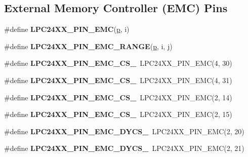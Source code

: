\subsection*{External Memory Controller (E\+MC) Pins}
\begin{DoxyCompactItemize}
\item 
\#define {\bfseries L\+P\+C24\+X\+X\+\_\+\+P\+I\+N\+\_\+\+E\+MC}(\mbox{\hyperlink{sun4u_2tte_8h_a27952ffc298d15b4fc0e7ee6b2a044ac}{p}},  i)
\item 
\#define {\bfseries L\+P\+C24\+X\+X\+\_\+\+P\+I\+N\+\_\+\+E\+M\+C\+\_\+\+R\+A\+N\+GE}(\mbox{\hyperlink{sun4u_2tte_8h_a27952ffc298d15b4fc0e7ee6b2a044ac}{p}},  i,  j)
\item 
\mbox{\label{group__lpc24xx__io_ga6345960feb225c5a71ecacb9d500dc6c}} 
\#define {\bfseries L\+P\+C24\+X\+X\+\_\+\+P\+I\+N\+\_\+\+E\+M\+C\+\_\+\+C\+S\+\_}~L\+P\+C24\+X\+X\+\_\+\+P\+I\+N\+\_\+\+E\+MC(4, 30)
\item 
\mbox{\label{group__lpc24xx__io_gaa30c60311e6005d08e1ccf1c231ca0f4}} 
\#define {\bfseries L\+P\+C24\+X\+X\+\_\+\+P\+I\+N\+\_\+\+E\+M\+C\+\_\+\+C\+S\+\_}~L\+P\+C24\+X\+X\+\_\+\+P\+I\+N\+\_\+\+E\+MC(4, 31)
\item 
\mbox{\label{group__lpc24xx__io_ga4c858855d3659c3833482fa2e6d5cbda}} 
\#define {\bfseries L\+P\+C24\+X\+X\+\_\+\+P\+I\+N\+\_\+\+E\+M\+C\+\_\+\+C\+S\+\_}~L\+P\+C24\+X\+X\+\_\+\+P\+I\+N\+\_\+\+E\+MC(2, 14)
\item 
\mbox{\label{group__lpc24xx__io_gabcfc27fd17054dae061ce4552db55a53}} 
\#define {\bfseries L\+P\+C24\+X\+X\+\_\+\+P\+I\+N\+\_\+\+E\+M\+C\+\_\+\+C\+S\+\_}~L\+P\+C24\+X\+X\+\_\+\+P\+I\+N\+\_\+\+E\+MC(2, 15)
\item 
\mbox{\label{group__lpc24xx__io_ga0bac5e89290e6e3c6acd518aa4093e44}} 
\#define {\bfseries L\+P\+C24\+X\+X\+\_\+\+P\+I\+N\+\_\+\+E\+M\+C\+\_\+\+D\+Y\+C\+S\+\_}~L\+P\+C24\+X\+X\+\_\+\+P\+I\+N\+\_\+\+E\+MC(2, 20)
\item 
\mbox{\label{group__lpc24xx__io_ga42b6e40561e747dd4b2271503d3337c2}} 
\#define {\bfseries L\+P\+C24\+X\+X\+\_\+\+P\+I\+N\+\_\+\+E\+M\+C\+\_\+\+D\+Y\+C\+S\+\_}~L\+P\+C24\+X\+X\+\_\+\+P\+I\+N\+\_\+\+E\+MC(2, 21)

\end{DoxyCompactItemize}
